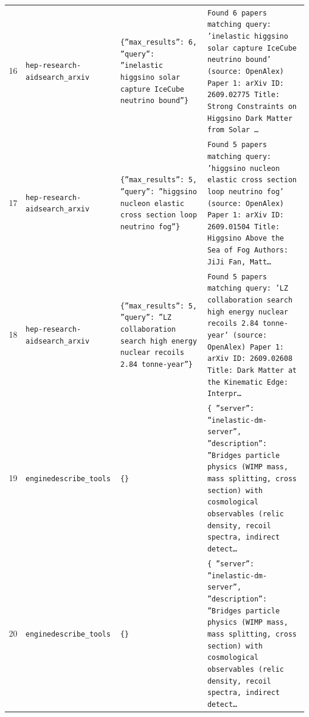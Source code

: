 \documentclass[11pt,a4paper]{article}
\begin{document}
\begin{longtable}{@{}p{}p{}p{}p{}@{}}
16 & \texttt{hep-research-aid}\newline\texttt{search\_\allowbreak{}arxiv} & \texttt{\{''max\_\allowbreak{}results'':\allowbreak{} 6,\allowbreak{} ''query'':\allowbreak{} ''inelastic higgsino solar capture IceCube neutrino bound''\}\allowbreak{}} & \texttt{Found 6 papers matching query:\allowbreak{} 'inelastic higgsino solar capture IceCube neutrino bound' (source:\allowbreak{} OpenAlex)\allowbreak{}  Paper 1:\allowbreak{} arXiv ID:\allowbreak{} 2609.02775 Title:\allowbreak{} Strong Constraints on Higgsino Dark Matter from Solar \ldots{}\allowbreak{}} \\
17 & \texttt{hep-research-aid}\newline\texttt{search\_\allowbreak{}arxiv} & \texttt{\{''max\_\allowbreak{}results'':\allowbreak{} 5,\allowbreak{} ''query'':\allowbreak{} ''higgsino nucleon elastic cross section loop neutrino fog''\}\allowbreak{}} & \texttt{Found 5 papers matching query:\allowbreak{} 'higgsino nucleon elastic cross section loop neutrino fog' (source:\allowbreak{} OpenAlex)\allowbreak{}  Paper 1:\allowbreak{} arXiv ID:\allowbreak{} 2609.01504 Title:\allowbreak{} Higgsino Above the Sea of Fog Authors:\allowbreak{} JiJi Fan,\allowbreak{} Matt\ldots{}\allowbreak{}} \\
18 & \texttt{hep-research-aid}\newline\texttt{search\_\allowbreak{}arxiv} & \texttt{\{''max\_\allowbreak{}results'':\allowbreak{} 5,\allowbreak{} ''query'':\allowbreak{} ''LZ collaboration search high energy nuclear recoils 2.84 tonne-year''\}\allowbreak{}} & \texttt{Found 5 papers matching query:\allowbreak{} 'LZ collaboration search high energy nuclear recoils 2.84 tonne-year' (source:\allowbreak{} OpenAlex)\allowbreak{}  Paper 1:\allowbreak{} arXiv ID:\allowbreak{} 2609.02608 Title:\allowbreak{} Dark Matter at the Kinematic Edge:\allowbreak{} Interpr\ldots{}\allowbreak{}} \\
19 & \texttt{engine}\newline\texttt{describe\_\allowbreak{}tools} & \texttt{\{\}\allowbreak{}} & \texttt{\{   ''server'':\allowbreak{} ''inelastic-dm-server'',\allowbreak{}   ''description'':\allowbreak{} ''Bridges particle physics (WIMP mass,\allowbreak{} mass splitting,\allowbreak{} cross section)\allowbreak{} with cosmological observables (relic density,\allowbreak{} recoil spectra,\allowbreak{} indirect detect\ldots{}\allowbreak{}} \\
20 & \texttt{engine}\newline\texttt{describe\_\allowbreak{}tools} & \texttt{\{\}\allowbreak{}} & \texttt{\{   ''server'':\allowbreak{} ''inelastic-dm-server'',\allowbreak{}   ''description'':\allowbreak{} ''Bridges particle physics (WIMP mass,\allowbreak{} mass splitting,\allowbreak{} cross section)\allowbreak{} with cosmological observables (relic density,\allowbreak{} recoil spectra,\allowbreak{} indirect detect\ldots{}\allowbreak{}} \\

\end{longtable}
\end{document}

